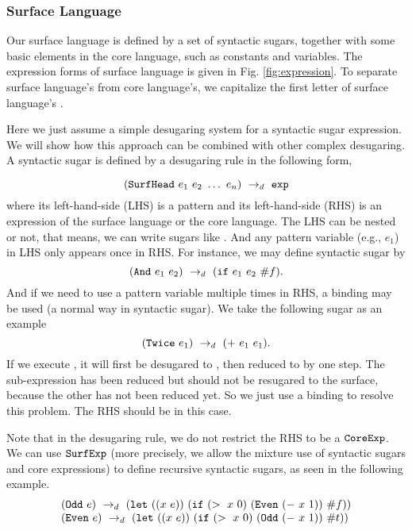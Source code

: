 
\subsubsection{Surface Language}

Our surface language is defined by a set of syntactic sugars, together with some basic elements in the core language, such as constants and variables. The expression forms of surface language is given in Fig.  \ref{fig:expression}. To separate surface language's  from core language's, we capitalize the first letter of surface language's .

Here we just assume a simple desugaring system for a syntactic sugar expression. We will show how this approach can be combined with other complex desugaring. A syntactic sugar is defined by a desugaring rule in the following form,

\[
(\mbox{\tt SurfHead}~e_1~e_2~\ldots~e_n) ~\rightarrow_d~ \mbox{\tt exp}
\]
where its left-hand-side (LHS) is a pattern and its left-hand-side (RHS) is an expression of the surface language or the core language. The LHS can be nested or not, that means, we can write sugars like . And any pattern variable (e.g., $e_1$) in LHS only appears once in RHS. For instance, we may define syntactic sugar  by
\[
(\mbox{\tt And}~e_1~e_2) ~\rightarrow_d~ (\mbox{\tt if}~e_1~e_2~\#f).
\]
And if we need to use a pattern variable multiple times in RHS, a  binding may be used (a normal way in syntactic sugar). We take the following sugar as an example
\[
(\mbox{\tt Twice}~e_1) ~\rightarrow_d~ (+~e_1~e_1).
\]
If we execute , it will first be desugared to , then reduced to  by one step. The sub-expression  has been reduced but should not be resugared to the surface, because the other  has not been reduced yet.
So we just use a  binding to resolve this problem. The RHS should be  in this case.


Note that in the desugaring rule, we do not restrict the RHS to be a $\mbox{\tt CoreExp}$. We can use $\mbox{\tt SurfExp}$ (more precisely, we allow the mixture use of syntactic sugars and core expressions) to define recursive syntactic sugars, as seen in the following example.
\[
\begin{array}{l}
(\mbox{\tt Odd}~e) ~\rightarrow_d~ (\mbox{\tt let}~((x~e))~(\mbox{\tt if}~(>~x~0)~(\mbox{\tt Even}~(-~x~1))~\#f))\\
(\mbox{\tt Even}~e) ~\rightarrow_d~ (\mbox{\tt let}~((x~e))~(\mbox{\tt if}~(>~x~0)~(\mbox{\tt Odd}~(-~x~1))~\#t))
\end{array}
\]

